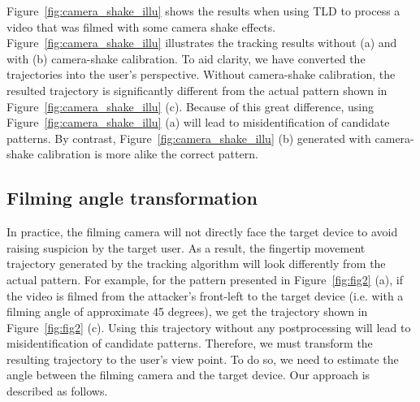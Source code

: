         Figure~\ref{fig:camera_shake_illu} shows the results when using TLD to process a video that was filmed with some camera shake effects.
        Figure~\ref{fig:camera_shake_illu} illustrates the tracking results without (a) and with (b) camera-shake calibration.
        To aid clarity, we have
        converted the trajectories into the user's perspective. Without
        camera-shake calibration, the resulted trajectory is significantly different from the actual pattern shown in Figure~\ref{fig:camera_shake_illu} (c).
        Because of this great difference, using Figure~\ref{fig:camera_shake_illu} (a)  will lead to misidentification of
        candidate patterns. By contrast, Figure~\ref{fig:camera_shake_illu} (b) generated with camera-shake calibration is more alike the correct pattern.


\subsection{Filming angle transformation}
\label{sec:transformation}
In practice, the filming camera will not directly face the target device to avoid raising suspicion by the target user. As a result, the
fingertip movement trajectory generated by the tracking
algorithm will look differently from the actual pattern. For example, for the
pattern presented in Figure~\ref{fig:fig2} (a), if the video is filmed from the attacker's front-left to the target device (i.e. with a filming angle of approximate 45 degrees),
we get the trajectory shown in Figure~\ref{fig:fig2} (c).
Using this trajectory without any postprocessing will lead to misidentification of candidate patterns.
Therefore, we must transform the resulting trajectory to the user's view point. To do so, we need to estimate the angle between the filming camera and the target device. Our approach is described as follows.

